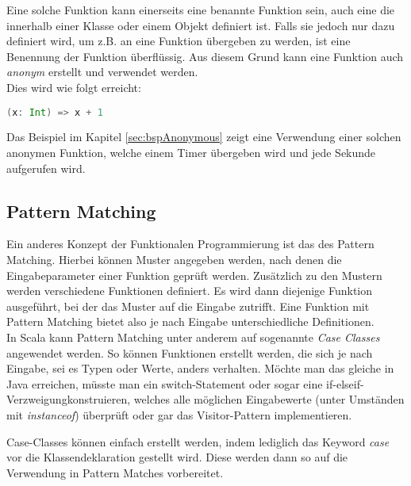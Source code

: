 Eine solche Funktion kann einerseits eine benannte Funktion sein, auch
eine die innerhalb einer Klasse oder einem Objekt definiert ist.  Falls
sie jedoch nur dazu definiert wird, um z.B. an eine Funktion übergeben
zu werden, ist eine Benennung der Funktion überflüssig. Aus diesem Grund
kann eine Funktion auch \emph{anonym} erstellt und verwendet werden.\\

Dies wird wie folgt erreicht: 

\begin{lstlisting}[float=ht,language=scala,caption=Anonyme Funktion,label=lst:anonymousFunction]
(x: Int) => x + 1
\end{lstlisting}

Das Beispiel im Kapitel \ref{sec:bspAnonymous} zeigt eine Verwendung einer solchen 
anonymen Funktion, welche einem Timer übergeben wird und jede Sekunde
aufgerufen wird. \\

\subsection{Pattern Matching}
\label{sec:patternMatching}

Ein anderes Konzept der Funktionalen Programmierung ist das des Pattern
Matching. Hierbei können Muster angegeben werden, nach denen die
Eingabeparameter einer Funktion geprüft werden. Zusätzlich zu den
Mustern werden verschiedene Funktionen definiert. Es wird dann diejenige
Funktion ausgeführt, bei der das Muster auf die Eingabe zutrifft. Eine
Funktion mit Pattern Matching bietet also je nach Eingabe unterschiedliche
Definitionen. \\

In Scala kann Pattern Matching unter anderem auf sogenannte \emph{Case
Classes} angewendet werden. So können Funktionen erstellt werden, die
sich je nach Eingabe, sei es Typen oder Werte, anders verhalten.  Möchte
man das gleiche in Java erreichen, müsste man ein switch-Statement
oder sogar eine \glqq if-elseif-Verzweigung\grqq konstruieren, welches
alle möglichen Eingabewerte (unter Umständen mit \emph{instanceof})
überprüft oder gar das Visitor-Pattern implementieren.

Case-Classes können einfach erstellt werden, indem lediglich das Keyword
\emph{case} vor die Klassendeklaration gestellt wird. Diese werden
dann so auf die Verwendung in Pattern Matches \glqq vorbereitet\grqq .\\

